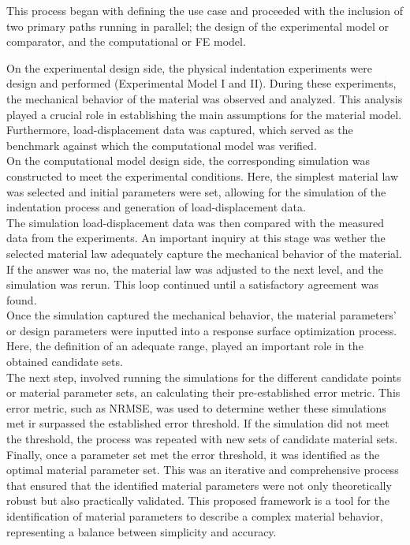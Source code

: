 This process began with defining the use case and proceeded with the inclusion of two primary paths
running in parallel; the design of the experimental model or comparator, and the computational or FE model.

On the experimental design side, the physical indentation experiments were design and performed (Experimental 
Model I and II). During these experiments, the mechanical behavior of the material was observed and analyzed.
This analysis played a crucial role in establishing the main assumptions for the material model. Furthermore, 
load-displacement data was captured, which served as the benchmark 
against which the computational model was verified.\\

On the computational model design side, the corresponding simulation was constructed to meet the experimental 
conditions. Here, the simplest material law was selected and initial parameters were set, allowing for the simulation of 
the indentation process and generation of load-displacement data.\\

The simulation load-displacement data was then compared with the measured data from the experiments.
An important inquiry at this stage was wether the selected material law adequately capture the mechanical 
behavior of the material. If the answer was no, the material law was adjusted to the next level, and the 
simulation was rerun. This loop continued until a satisfactory agreement was found.\\

Once the simulation captured the mechanical behavior, the material parameters' or design parameters were inputted into a 
response surface optimization process. Here, the definition of an adequate range, played an important role 
in the obtained candidate sets.\\ 

The next step, involved running the simulations for the different candidate points or material parameter sets,
an calculating their pre-established error metric. This error metric, such as NRMSE, was used to determine 
wether these simulations met ir surpassed the established error threshold. If the simulation did not meet the threshold, 
the process was repeated with new sets of candidate material sets.\\

Finally, once a parameter set met the error threshold, it was identified as the optimal material parameter set.
This was an iterative and comprehensive process that ensured that the identified material 
parameters were not only theoretically robust but also practically validated.
This proposed framework is a tool for the identification of material parameters to describe a complex material behavior,
representing a balance between simplicity and accuracy. 


